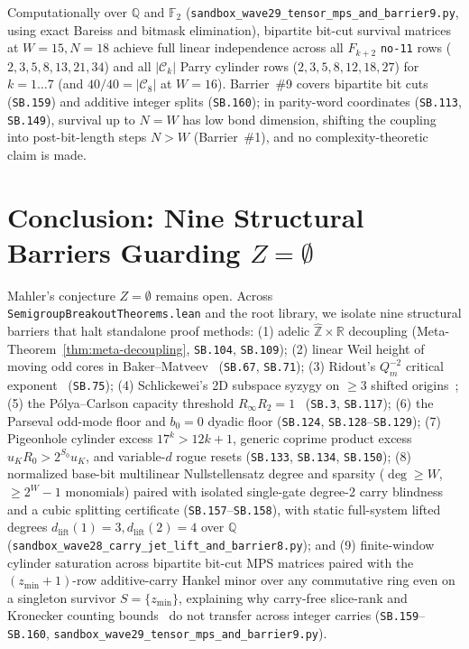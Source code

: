 \documentclass[11pt]{article}
\begin{document}
Computationally over $\mathbb{Q}$ and $\mathbb{F}_2$ (\nolinkurl{sandbox_wave29_tensor_mps_and_barrier9.py}, using exact Bareiss and bitmask elimination), bipartite bit-cut survival matrices at $W = 15, N = 18$ achieve full linear independence across all $F_{k+2}$ \texttt{no-11} rows ($2,3,5,8,13,21,34$) and all $|\mathcal{C}_k|$ Parry cylinder rows ($2,3,5,8,12,18,27$) for $k = 1\dots 7$ (and $40/40 = |\mathcal{C}_8|$ at $W = 16$). Barrier~\#9 covers bipartite bit cuts (\texttt{SB.159}) and additive integer splits (\texttt{SB.160}); in parity-word coordinates (\texttt{SB.113}, \texttt{SB.149}), survival up to $N = W$ has low bond dimension, shifting the coupling into post-bit-length steps $N > W$ (Barrier~\#1), and no complexity-theoretic claim is made.

\section{Conclusion: Nine Structural Barriers Guarding $Z = \emptyset$}

Mahler's conjecture $Z = \emptyset$ remains open. Across \nolinkurl{SemigroupBreakoutTheorems.lean} and the root library, we isolate nine structural barriers that halt standalone proof methods: (1) adelic $\widehat{\mathbb{Z}} \times \mathbb{R}$ decoupling (Meta-Theorem~\ref{thm:meta-decoupling}, \texttt{SB.104}, \texttt{SB.109}); (2) linear Weil height of moving odd cores in Baker--Matveev~\cite{Matveev2000} (\texttt{SB.67}, \texttt{SB.71}); (3) Ridout's $Q_m^{-2}$ critical exponent~\cite{Ridout1957} (\texttt{SB.75}); (4) Schlickewei's 2D subspace syzygy on $\ge 3$ shifted origins~\cite{Schlickewei1990}; (5) the P\'olya--Carlson capacity threshold $R_\infty R_2 = 1$~\cite{Polya1921} (\texttt{SB.3}, \texttt{SB.117}); (6) the Parseval odd-mode floor and $b_0 = 0$ dyadic floor (\texttt{SB.124}, \texttt{SB.128}--\texttt{SB.129}); (7) Pigeonhole cylinder excess $17^k > 12k+1$, generic coprime product excess $u_K R_0 > 2^{S_0} u_K$, and variable-$d$ rogue resets (\texttt{SB.133}, \texttt{SB.134}, \texttt{SB.150}); (8) normalized base-bit multilinear Nullstellensatz degree and sparsity ($\deg \ge W$, $\ge 2^W - 1$ monomials) paired with isolated single-gate degree-2 carry blindness and a cubic splitting certificate (\texttt{SB.157}--\texttt{SB.158}), with static full-system lifted degrees $d_{\text{lift}}(1) = 3, d_{\text{lift}}(2) = 4$ over $\mathbb{Q}$ (\nolinkurl{sandbox_wave28_carry_jet_lift_and_barrier8.py}); and (9) finite-window cylinder saturation across bipartite bit-cut MPS matrices paired with the $(z_{\min}+1)$-row additive-carry Hankel minor over any commutative ring even on a singleton survivor $S = \{z_{\min}\}$, explaining why carry-free slice-rank and Kronecker counting bounds~\cite{ErdosRado1960,Strassen1987,NaslundSawin2017} do not transfer across integer carries (\texttt{SB.159}--\texttt{SB.160}, \nolinkurl{sandbox_wave29_tensor_mps_and_barrier9.py}).
\end{document}
